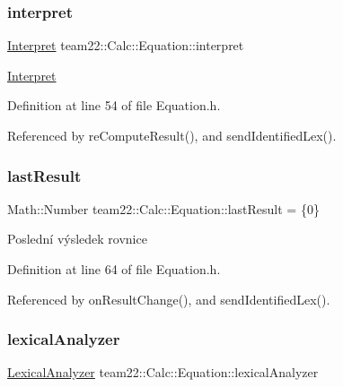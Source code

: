 \subsubsection{\texorpdfstring{interpret}{interpret}}
{\footnotesize\ttfamily \hyperlink{classteam22_1_1_calc_1_1_interpret}{Interpret} team22\+::\+Calc\+::\+Equation\+::interpret\hspace{0.3cm}{\ttfamily [private]}}

\hyperlink{classteam22_1_1_calc_1_1_interpret}{Interpret} 

Definition at line 54 of file Equation.\+h.



Referenced by re\+Compute\+Result(), and send\+Identified\+Lex().

\mbox{\label{classteam22_1_1_calc_1_1_equation_a7c62440412a33b3b3300e63ff65ffafb}} 
\subsubsection{\texorpdfstring{last\+Result}{lastResult}}
{\footnotesize\ttfamily Math\+::\+Number team22\+::\+Calc\+::\+Equation\+::last\+Result = \{0\}\hspace{0.3cm}{\ttfamily [private]}}

Poslední výsledek rovnice 

Definition at line 64 of file Equation.\+h.



Referenced by on\+Result\+Change(), and send\+Identified\+Lex().

\mbox{\label{classteam22_1_1_calc_1_1_equation_a65aeaa2a279994b03517a22addf31fc1}} 
\subsubsection{\texorpdfstring{lexical\+Analyzer}{lexicalAnalyzer}}
{\footnotesize\ttfamily \hyperlink{classteam22_1_1_calc_1_1_lexical_analyzer}{Lexical\+Analyzer} team22\+::\+Calc\+::\+Equation\+::lexical\+Analyzer\hspace{0.3cm}{\ttfamily [private]}}

